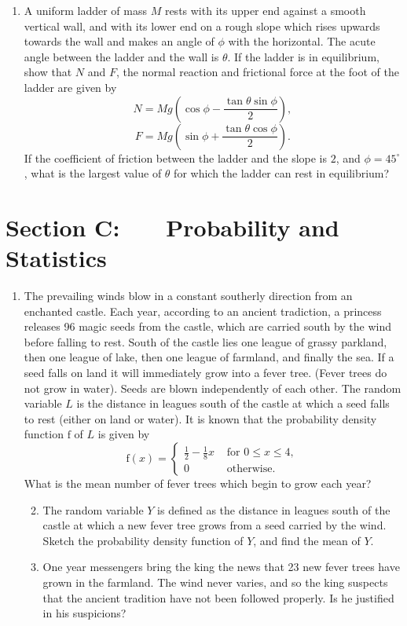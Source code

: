 \documentclass[a4, 11pt]{report}
\newlength{\qspace}
\newcounter{qnumber}
\newenvironment{question}%
 {\vspace{\qspace}
  \begin{enumerate}[\bfseries 1\quad][10]%
    \setcounter{enumi}{\value{qnumber}}%
    \item%
 }
{
  \end{enumerate}
  \filbreak
  \stepcounter{qnumber}
 }
\newenvironment{questionparts}[1][1]%
 {
  \begin{enumerate}[\bfseries (i)]%
    \setcounter{enumii}{#1}
    \addtocounter{enumii}{-1}
    \setlength{\itemsep}{5mm}
    \setlength{\parskip}{8pt}
 }
 {
  \end{enumerate}
 }
\begin{document}
\begin{question}
A uniform ladder of mass $M$ rests with its upper end against a smooth
vertical wall, and with its lower end on a rough slope which rises
upwards towards the wall and makes an angle of $\phi$ with the horizontal.
The acute angle between the ladder and the wall is $\theta$. If the
ladder is in equilibrium, show that $N$ and $F$, the normal reaction
and frictional force at the foot of the ladder are given by 
\[
N=Mg\left(\cos\phi-\frac{\tan\theta\sin\phi}{2}\right),
\]
\[
F=Mg\left(\sin\phi+\frac{\tan\theta\cos\phi}{2}\right).
\]
If the coefficient of friction between the ladder and the slope is
$2$, and $\phi=45^{\circ}$, what is the largest value of $\theta$
for which the ladder can rest in equilibrium?
\end{question}
	
	\newpage
\section*{Section C: \ \ \ Probability and Statistics}


\begin{question}
The prevailing winds blow in a constant southerly direction from an
enchanted castle. Each year, according to an ancient tradiction, a
princess releases 96 magic seeds from the castle, which are carried
south by the wind before falling to rest. South of the castle lies
one league of grassy parkland, then one league of lake, then one league
of farmland, and finally the sea. If a seed falls on land it will
immediately grow into a fever tree. (Fever trees do not grow in water).
Seeds are blown independently of each other. The random variable $L$
is the distance in leagues south of the castle at which a seed falls
to rest (either on land or water). It is known that the probability
density function $\mathrm{f}$ of $L$ is given by 
\[
\mathrm{f}(x)=\begin{cases}
\frac{1}{2}-\frac{1}{8}x & \mbox{ for }0\leqslant x\leqslant4,\\
0 & \mbox{ otherwise.}
\end{cases}
\]
What is the mean number of fever trees which begin to grow each year?

\begin{questionparts}
\item The random variable $Y$ is defined as the distance in leagues south
of the castle at which a new fever tree grows from a seed carried
by the wind. Sketch the probability density function of $Y$, and
find the mean of $Y$. 
\item One year messengers bring the king the news that 23 new fever trees
have grown in the farmland. The wind never varies, and so the king
suspects that the ancient tradition have not been followed properly.
Is he justified in his suspicions?
\end{questionparts}
\end{question}
\end{document}
